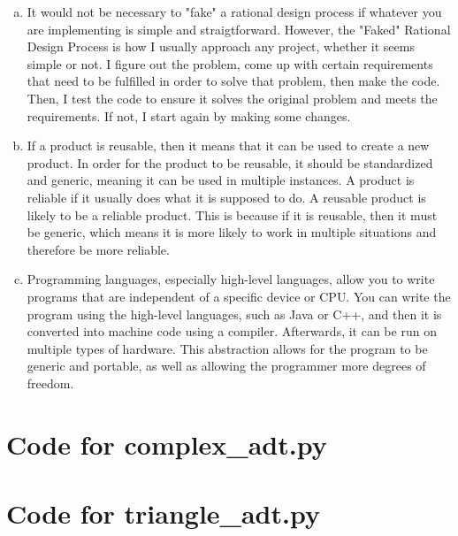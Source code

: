 \documentclass[12pt]{article}
\begin{document}
\begin{enumerate}[(a)]
\item It would not be necessary to "fake" a rational design process if whatever you are implementing is simple and straigtforward. However, the "Faked" Rational Design Process is how I usually approach any project, whether it seems simple or not. I figure out the problem, come up with certain requirements that need to be fulfilled in order to solve that problem, then make the code. Then, I test the code to ensure it solves the original problem and meets the requirements. If not, I start again by making some changes.
\item If a product is reusable, then it means that it can be used to create a new product. In order for the product to be reusable, it should be standardized and generic, meaning it can be used in multiple instances. A product is reliable if it usually does what it is supposed to do. A reusable product is likely to be a reliable product. This is because if it is reusable, then it must be generic, which means it is more likely to work in multiple situations and therefore be more reliable.
\item Programming languages, especially high-level languages, allow you to write programs that are independent of a specific device or CPU. You can write the program using the high-level languages, such as Java or C++, and then it is converted into machine code using a compiler. Afterwards, it can be run on multiple types of hardware. This abstraction allows for the program to be generic and portable, as well as allowing the programmer more degrees of freedom.

\end{enumerate}

\newpage

\lstset{language=Python, basicstyle=\tiny, breaklines=true, showspaces=false,
  showstringspaces=false, breakatwhitespace=true}

\def\thesection{\Alph{section}}

\section{Code for complex\_adt.py}

\noindent 

\newpage

\section{Code for triangle\_adt.py}
\end{document}
